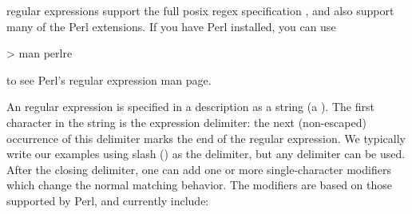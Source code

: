 \pads{} regular expressions support the full posix regex specification
,
and also support many of the Perl extensions.  If you have Perl
installed, you can use 

\begin{centercode}
    > man perlre
\end{centercode}
%
\noindent
to see Perl's regular expression man page.

An regular expression is specified in a \pads{} description
as a string (a ).  The first character in
the string is the expression delimiter: the next (non-escaped) occurrence of
this delimiter marks the end of the regular expression.
We typically write our examples using slash (\cd{/}) as the
delimiter, but any delimiter can be used.  After the closing
delimiter, one can add one or more single-character
modifiers which change the normal matching behavior.  The
modifiers are based on those supported by Perl, and
currently include:
